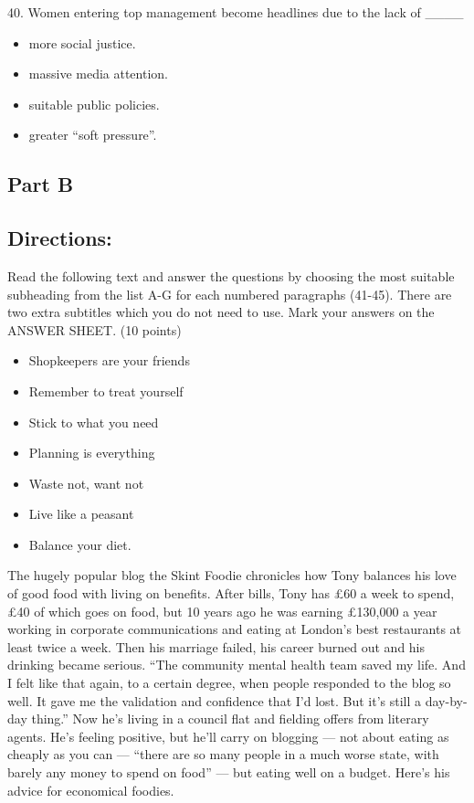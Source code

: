 \documentclass[UTF8,11pt]{ctexart}
\begin{document}
40. Women entering top management become headlines due to the lack of \_\_\_\_


\begin{itemize}[leftmargin=2em,itemsep=.2em,topsep=.4em]\item[A.] more social justice.
\item[B.] massive media attention.
\item[C.] suitable public policies.
\item[D.] greater “soft pressure”.
\end{itemize}

\subsection*{\textbf{Part B}}


\subsection*{\textbf{Directions:}}


Read the following text and answer the questions by choosing the most suitable subheading from the list A-G for each numbered paragraphs (41-45). There are two extra subtitles which you do not need to use. Mark your answers on the ANSWER SHEET. (10 points)


\begin{itemize}[leftmargin=2em,itemsep=.2em,topsep=.4em]\item[A.] Shopkeepers are your friends
\item[B.] Remember to treat yourself
\item[C.] Stick to what you need
\item[D.] Planning is everything
\item[E.] Waste not, want not
\item[F.] Live like a peasant
\item[G.] Balance your diet.
\end{itemize}

The hugely popular blog the Skint Foodie chronicles how Tony balances his love of good food with living on benefits. After bills, Tony has £60 a week to spend, £40 of which goes on food, but 10 years ago he was earning £130,000 a year working in corporate communications and eating at London’s best restaurants at least twice a week. Then his marriage failed, his career burned out and his drinking became serious. “The community mental health team saved my life. And I felt like that again, to a certain degree, when people responded to the blog so well. It gave me the validation and confidence that I’d lost. But it’s still a day-by-day thing.” Now he’s living in a council flat and fielding offers from literary agents. He’s feeling positive, but he’ll carry on blogging — not about eating as cheaply as you can — “there are so many people in a much worse state, with barely any money to spend on food” — but eating well on a budget. Here’s his advice for economical foodies.
\end{document}
